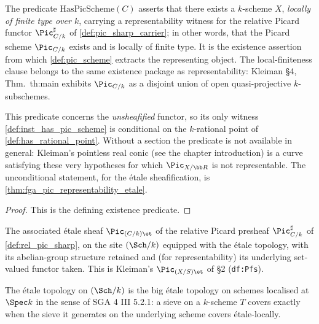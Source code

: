 \begin{definition}\leanok
  \label{def:has_pic_scheme}
  The predicate \(\mathrm{HasPicScheme}(C)\) asserts that there exists a \(k\)-scheme
  \(X\), \emph{locally of finite type over \(k\)}, carrying a
  representability witness for the relative Picard functor
  \(\Pic^\sharp_{C/k}\) of \cref{def:pic_sharp_carrier}; in other words,
  that the Picard scheme \(\Pic_{C/k}\) exists and is locally of finite
  type. It is the existence assertion from which \cref{def:pic_scheme}
  extracts the representing object. The local-finiteness clause belongs to
  the same existence package as representability: Kleiman \S 4,
  Thm.~th:main exhibits \(\Pic_{C/k}\) as a disjoint union of open
  quasi-projective \(k\)-subschemes.

  This predicate concerns the \emph{unsheafified} functor, so its only witness
  \cref{def:inst_has_pic_scheme} is conditional on the \(k\)-rational point of
  \cref{def:has_rational_point}. Without a section the predicate is not available
  in general: Kleiman's pointless real conic (see the chapter introduction) is a
  curve satisfying these very hypotheses for which \(\Pic_{X/\bb R}\) is not
  representable. The unconditional statement, for the \'etale sheafification, is
  \cref{thm:fga_pic_representability_etale}.
\end{definition}

\begin{proof}
  This is the defining existence predicate.
\end{proof}

\begin{definition}\leanok
  \label{def:pic_et_sheaf}
  The associated \'etale sheaf \(\Pic_{(C/k)\et}\) of the relative Picard
  presheaf \(\Pic^\sharp_{C/k}\) of \cref{def:rel_pic_sharp}, on the site
  \((\Sch/k)\) equipped with the \'etale topology, with its abelian-group
  structure retained and (for representability) its underlying set-valued
  functor taken. This is Kleiman's \(\Pic_{(X/S)\et}\) of \S 2 (\texttt{df:Pfs}).

  The \'etale topology on \((\Sch/k)\) is the big \'etale topology on schemes
  localised at \(\Spec k\) in the sense of SGA 4 III 5.2.1: a sieve on a
  \(k\)-scheme \(T\) covers exactly when the sieve it generates on the
  underlying scheme covers \'etale-locally.
\end{definition}

